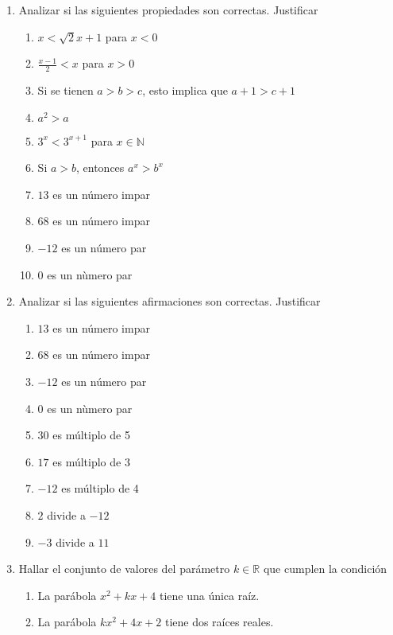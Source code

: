 \documentclass[a4paper]{article}
\newcommand{\exercise}{\item}
\begin{document}
\begin{enumerate}
\begin{enumerate} [label=(\alph*)]
		\item $-8(x-2)(2x+7)<0$
	\end{enumerate}
	\exercise Analizar si las siguientes propiedades son correctas. Justificar
	\begin{multicols}{2}
	\begin{enumerate} [label=(\alph*)]
		\item $x < \sqrt{2} x +1$ para $x<0$
		\item $\displaystyle\frac{x-1}{2} < x$ para $x>0$
		\item Si se tienen $a>b>c$, esto implica que $a+1>c+1$
		\item $a^2 > a$
		\item $3^{x} < 3^{x+1}$ para $x \in \mathbb{N}$
		\item Si $a>b$, entonces $a^x > b^x$
		\item $13$ es un número impar
		\item $68$ es un número impar
		\item $-12$ es un número par
		\item $0$ es un nùmero par
	\end{enumerate}
	\end{multicols}
	\exercise Analizar si las siguientes afirmaciones son correctas. Justificar
	\begin{multicols}{2}
	\begin{enumerate} [label=(\alph*)]
		\item $13$ es un número impar
		\item $68$ es un número impar
		\item $-12$ es un número par
		\item $0$ es un nùmero par
		\item $30$ es múltiplo de 5
		\item $17$ es múltiplo de 3
		\item $-12$ es múltiplo de 4
		\item $2$ divide a $-12$
		\item $-3$ divide a $11$
	\end{enumerate}
	\end{multicols}
	\exercise Hallar el conjunto de valores del parámetro $k \in \mathbb{R}$ que cumplen la condición
	\begin{enumerate} [label=(\alph*)]
		\item La parábola $x^2+kx+4$ tiene una única raíz.
		\item La parábola $kx^2+4x+2$ tiene dos raíces reales.

\end{enumerate}
\end{enumerate}
\end{document}
